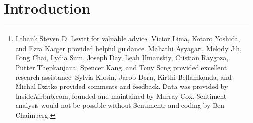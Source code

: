 \documentclass[11pt, oneside]{article}
\begin{document}
\begin{abstract}
Racial bias faced by Airbnb hosts is a topic largely underrepresented within economic literature. Earlier research has attempted to measure discrimination against New York City hosts, but was limited by a small sample size and narrow set of controls. I address this issue by using a previously unexploited dataset from a large webscrape of the Airbnb website to measure discrimination. Controlling for a large set of covariates, I estimate that black hosts earn \$5 - 7 less per night, and Asian hosts \$6 - 9 less per night (depending on the sex of the host) than white hosts who post a similar type of listing. I then explore various hypotheses for this effect. There is little evidence that these price disparities are due to minority hosts choosing to price their listings lower because of differences in their marginal cost, or offering their listing up for rent for shorter periods of time, than white hosts. I also find little evidence that this effect is due to minority hosts owning listings of worse quality. Overall, among the hypotheses I test, discrimination is the most convincing explanation for this persistent price disparity.\footnote{I thank Steven D. Levitt for valuable advice. Victor Lima, Kotaro Yoshida, and Ezra Karger provided helpful guidance. Mahathi Ayyagari, Melody Jih, Fong Chai, Lydia Sum, Joseph Day, Leah Umanskiy, Cristian Raygoza, Putter Thepkanjana, Spencer Kang, and Tony Song provided excellent research assistance. Sylvia Klosin, Jacob Dorn, Kirthi Bellamkonda, and Michal Dzitko provided comments and feedback. Data was provided by InsideAirbnb.com, founded and maintained by Murray Cox. Sentiment analysis would not be possible without Sentimentr and coding by Ben Chaimberg.} \end{abstract}

\doublespacing
\section{Introduction} %
\end{document}
